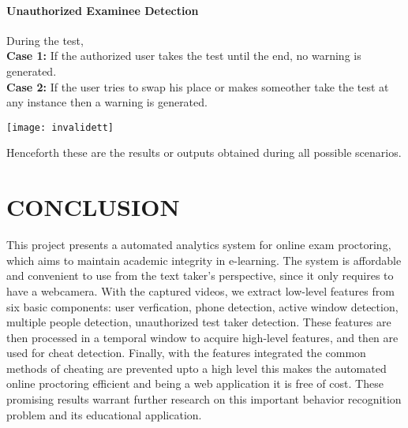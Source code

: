 \documentclass[12pt]{report}
\begin{document}
\subsubsection{Unauthorized Examinee Detection}
During the test,\\
\textbf{Case 1:} If the authorized user takes the test until the end, no warning is generated.\\
\textbf{Case 2:} If the user tries to swap his place or makes someother take the test at any instance then a warning is generated.
\begin{center}
\texttt{[image: invalidett]}
\end{center}
Henceforth these are the results or outputs obtained during all possible scenarios.

\chapter{CONCLUSION}
This project presents a automated analytics system for online
exam proctoring, which aims to maintain academic integrity
in e-learning. The system is affordable and convenient to use
from the text taker’s perspective, since it only requires to
have a webcamera. With the
captured videos, we extract low-level features from
six basic components: user verfication, phone
detection, active window detection, multiple people
detection, unauthorized test taker detection. These features are then processed in a temporal
window to acquire high-level features, and then are used for
cheat detection. Finally, with the features integrated the common methods of cheating are prevented upto a high level this makes the automated online proctoring efficient and being a web application it is free of cost.
These promising results
warrant further research on this important behavior recognition
problem and its educational application.
\end{document}
